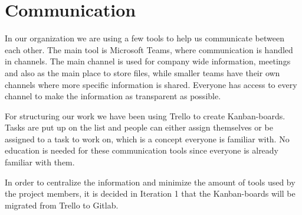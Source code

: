 \section{Communication}
\label{sec:communication}

In our organization we are using a few tools to help us communicate between each other. The main tool is Microsoft Teams, where communication is handled in channels. The main channel is used for company wide information, meetings and also as the main place to store files, while smaller teams have their own channels where more specific information is shared. Everyone has access to every channel to make the information as transparent as possible.

For structuring our work we have been using Trello to create Kanban-boards. Tasks are put up on the list and people can either assign themselves or be assigned to a task to work on, which is a concept everyone is familiar with. No education is needed for these communication tools since everyone is already familiar with them.

In order to centralize the information and minimize the amount of tools used by the project members, it is decided in Iteration 1 that the Kanban-boards will be migrated from Trello to Gitlab. 
